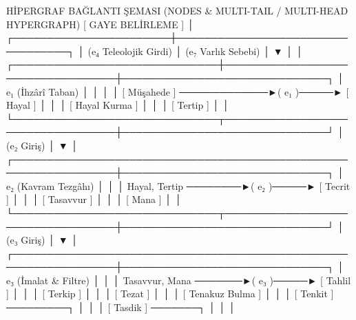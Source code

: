 \documentclass[11pt,a4paper]{article}
\begin{document}
HİPERGRAF BAĞLANTI ŞEMASI (NODES & MULTI-TAIL / MULTI-HEAD HYPERGRAPH)
                       [ GAYE BELİRLEME ]
                               │
       ┌───────────────────────┼──────────────────────────────────┐
       │ (e₄ Teleolojik Girdi) │ (e₇ Varlık Sebebi)               │
       ▼                       │                                  │
┌──────────────────────────────┼──────────────────────────────────┼──────────────────────────────┐
│  e₁ (İhzârî Taban)           │                                  │                              │
│  [ Müşahede ] ─────────────►( e₁ )─────► [ Hayal ]              │                              │
│                                           [ Hayal Kurma ]       │                              │
│                                           [ Tertip ]            │                              │
└──────────────────────────────┬──────────────────────────────────┼──────────────────────────────┘
                               │ (e₂ Giriş)                       │
                               ▼                                  │
┌─────────────────────────────────────────────────────────────────┼──────────────────────────────┐
│  e₂ (Kavram Tezgâhı)                                            │                              │
│  { Hayal, Tertip } ────────►( e₂ )─────► [ Tecrit ]             │                              │
│                                           [ Tasavvur ]          │                              │
│                                           [ Mana ]              │                              │
└──────────────────────────────┬──────────────────────────────────┼──────────────────────────────┘
                               │ (e₃ Giriş)                       │
                               ▼                                  │
┌─────────────────────────────────────────────────────────────────┼──────────────────────────────┐
│  e₃ (İmalat & Filtre)                                           │                              │
│  { Tasavvur, Mana } ───────►( e₃ )─────► [ Tahlil ]             │                              │
│                                           [ Terkip ]            │                              │
│                                           [ Tezat ]             │                              │
│                                           [ Tenakuz Bulma ]     │                              │
│                                           [ Tenkit ] ─────────┐ │                              │
│                                           [ Tasdik ] ───────┐ │ │                              │
\end{document}
